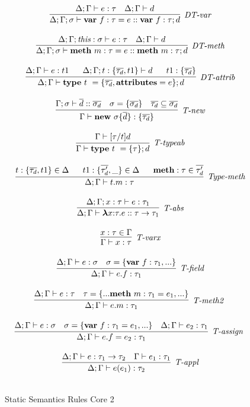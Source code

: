 \begin{figure}
\centering
\[
\begin{array}{c}
\infer[\textit{DT-var}]
	{\Delta; \Gamma; \sigma \vdash \keyw{var}~ f:\tau = e :: \keyw{var}~ f:\tau; d }
	{\Delta; \Gamma \vdash e : \tau & \Delta; \Gamma \vdash d} \\[3ex]
	
\infer[\textit{DT-meth}]
	{\Delta; \Gamma; \sigma \vdash \keyw{meth}~ m:\tau = e :: \keyw{meth}~ m:\tau; d }
	{\Delta; \Gamma; \textit{this}:\sigma \vdash e : \tau & \Delta; \Gamma \vdash d } \\[3ex]

\infer[\textit{DT-attrib}]
	{\Delta; \Gamma \vdash  \keyw{type}~ t~=\{\overline{\tau_d}, \keyw{attributes}=e\}; d} 
	{\Delta; \Gamma \vdash e:t1 ~~~~~ \Delta; \Gamma; t:\{\overline{\tau_d},t1\} \vdash d ~~~~~ t1: \{\overline{\tau_d}\}  }\\[3ex]

\infer[\textit{T-new}]
	{\Gamma \vdash \keyw{new}~\sigma \{ \overline{d} \} : \{ \overline{\tau_d} \}}
	{\Gamma; \sigma \vdash \overline{d} :: \overline{\sigma_d} & \sigma = \{ \overline{\sigma_d} \} & \overline{\tau_d} \subseteq \overline{\sigma_d}} \\[3ex]

\infer[\textit{T-typeab}]
	{\Gamma \vdash  \keyw{type}~ t~=\{\tau\}; d} 
	{\Gamma \vdash [\tau/t]d }\\[3ex]


\infer[\textit{Type-meth}]
	{\Delta; \Gamma \vdash  t.m:\tau} 
	{t : \{\overline{\tau_d}, t1\} \in \Delta ~~~~~ t1 : \{\overline{\tau'_d},\_\} \in \Delta ~~~~~ \keyw{meth}:\tau \in \overline{\tau'_d}   }\\[3ex]
	
\infer[\textit{T-abs}]
	{\Delta; \Gamma \vdash  \boldsymbol\lambda x{:}\tau . e :: \tau \rightarrow \tau_1} 
	{\Delta; \Gamma; x:\tau \vdash e:\tau_1 }\\[3ex]

\infer[\textit{T-varx}]
	{\Gamma \vdash x:\tau} 
	{x:\tau \in \Gamma }\\[3ex]

\infer[\textit{T-field}]
	{\Delta; \Gamma \vdash  e.f:\tau_1} 
	{\Delta; \Gamma \vdash e:\sigma & \sigma= \{\keyw{var}~ f:\tau_1,... \} }\\[3ex]

\infer[\textit{T-meth2 }]
	{\Delta; \Gamma \vdash  e.m:\tau_1} 
	{\Delta; \Gamma \vdash e:\tau & \tau=\{...\keyw{meth}~ m:\tau_1=e_1,... \} }\\[3ex]

\infer[\textit{T-assign }]
	{\Delta; \Gamma \vdash  e.f=e_2:\tau_1} 
	{\Delta; \Gamma \vdash e:\sigma & \sigma= \{\keyw{var}~ f:\tau_1=e_1,... \} & \Delta; \Gamma\vdash e_2:\tau_1 }\\[3ex]

\infer[\textit{T-appl}]
	{\Delta; \Gamma \vdash  e(e_1):\tau_2} 
	{\Delta; \Gamma \vdash e:\tau_1 \rightarrow \tau_2 & \Gamma \vdash e_1:\tau_1}\\[3ex]

\end{array}
\]
\caption{Static Semantics Rules Core 2}
\end{figure}

